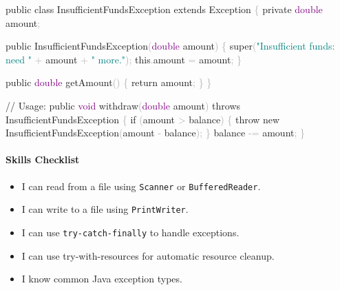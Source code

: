 \documentclass[
  justified,
  openright,
]{tufte-book}
\let\subsubsection\paragraph
\let\paragraph\paragraph
\newcommand{\BuiltInTok}[1]{#1}
\newcommand{\CommentTok}[1]{\textcolor{MidGray}{#1}}
\newcommand{\ControlFlowTok}[1]{\textcolor{BrandBlue}{#1}}
\newcommand{\DataTypeTok}[1]{\textcolor{Purple}{#1}}
\newcommand{\FunctionTok}[1]{\textcolor{BrandBlue}{#1}}
\newcommand{\KeywordTok}[1]{\textcolor{BrandBlue}{#1}}
\newcommand{\NormalTok}[1]{#1}
\newcommand{\OperatorTok}[1]{\textcolor{DarkGray}{#1}}
\newcommand{\StringTok}[1]{\textcolor{Teal}{#1}}
\newenvironment{Shaded}{%
  \begin{snugshade}
}{%
  \end{snugshade}
}
\let\subsubsection\paragraph
\let\paragraph\paragraph
\providecommand{\tightlist}{%
  \setlength{\itemsep}{0pt}\setlength{\parskip}{0pt}}
\begin{document}
\begin{Shaded}
\begin{Highlighting}[]
\KeywordTok{public} \KeywordTok{class}\NormalTok{ InsufficientFundsException }\KeywordTok{extends} \BuiltInTok{Exception} \OperatorTok{\{}
    \KeywordTok{private} \DataTypeTok{double}\NormalTok{ amount}\OperatorTok{;}

    \KeywordTok{public} \FunctionTok{InsufficientFundsException}\OperatorTok{(}\DataTypeTok{double}\NormalTok{ amount}\OperatorTok{)} \OperatorTok{\{}
        \KeywordTok{super}\OperatorTok{(}\StringTok{"Insufficient funds: need "} \OperatorTok{+}\NormalTok{ amount }\OperatorTok{+} \StringTok{" more."}\OperatorTok{);}
        \KeywordTok{this}\OperatorTok{.}\FunctionTok{amount} \OperatorTok{=}\NormalTok{ amount}\OperatorTok{;}
    \OperatorTok{\}}

    \KeywordTok{public} \DataTypeTok{double} \FunctionTok{getAmount}\OperatorTok{()} \OperatorTok{\{} \ControlFlowTok{return}\NormalTok{ amount}\OperatorTok{;} \OperatorTok{\}}
\OperatorTok{\}}

\CommentTok{// Usage:}
\KeywordTok{public} \DataTypeTok{void} \FunctionTok{withdraw}\OperatorTok{(}\DataTypeTok{double}\NormalTok{ amount}\OperatorTok{)} \KeywordTok{throws}\NormalTok{ InsufficientFundsException }\OperatorTok{\{}
    \ControlFlowTok{if} \OperatorTok{(}\NormalTok{amount }\OperatorTok{\textgreater{}}\NormalTok{ balance}\OperatorTok{)} \OperatorTok{\{}
        \ControlFlowTok{throw} \KeywordTok{new} \FunctionTok{InsufficientFundsException}\OperatorTok{(}\NormalTok{amount }\OperatorTok{{-}}\NormalTok{ balance}\OperatorTok{);}
    \OperatorTok{\}}
\NormalTok{    balance }\OperatorTok{{-}=}\NormalTok{ amount}\OperatorTok{;}
\OperatorTok{\}}
\end{Highlighting}
\end{Shaded}

\subsubsection{Skills Checklist}\label{skills-checklist-17}

\begin{itemize}
\tightlist
\item[$\square$]
  I can read from a file using \texttt{Scanner} or
  \texttt{BufferedReader}.
\item[$\square$]
  I can write to a file using \texttt{PrintWriter}.
\item[$\square$]
  I can use \texttt{try-catch-finally} to handle exceptions.
\item[$\square$]
  I can use try-with-resources for automatic resource cleanup.
\item[$\square$]
  I know common Java exception types.
\end{itemize}
\end{document}
